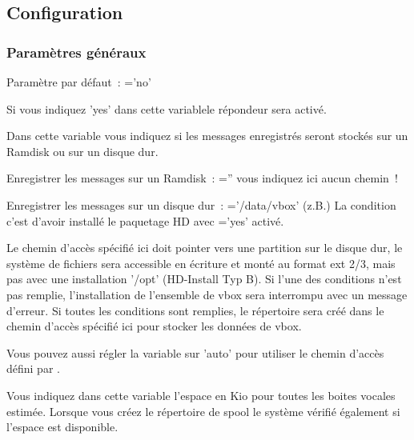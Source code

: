 \subsection{Configuration}
\subsubsection{Paramètres généraux}
\begin{description}


        Paramètre par défaut~: ='no'

        Si vous indiquez 'yes' dans cette variablele répondeur sera activé.


    Dans cette variable  vous indiquez si les messages enregistrés seront stockés
	sur un Ramdisk ou sur un disque dur.

    Enregistrer les messages sur un Ramdisk~:
    =''
    vous indiquez ici aucun chemin~!

    Enregistrer les messages sur un disque dur~:
    ='/data/vbox' (z.B.)
    La condition c'est d'avoir installé le paquetage HD avec ='yes' activé.

    Le chemin d'accès spécifié ici doit pointer vers une partition sur le disque dur, le système
	de fichiers sera accessible en écriture et monté au format ext 2/3, mais pas avec une installation
	'/opt' (HD-Install Typ B). Si l'une des conditions n'est pas remplie, l'installation de l'ensemble
	de vbox sera interrompu avec un message d'erreur. Si toutes les conditions sont remplies, le
	répertoire  sera créé dans le chemin d'accès spécifié ici pour stocker les
	données de vbox.

    Vous pouvez aussi régler la variable sur 'auto' pour utiliser le chemin d'accès défini par
	.


    Vous indiquez dans cette variable l'espace en Kio pour toutes les boites vocales estimée.
	Lorsque vous créez le répertoire de spool le système vérifié également si l'espace est
	disponible.



\end{description}
